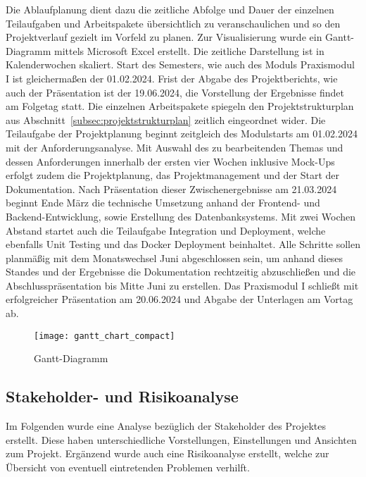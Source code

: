 Die Ablaufplanung dient dazu die zeitliche Abfolge und Dauer der einzelnen Teilaufgaben und Arbeitspakete übersichtlich zu veranschaulichen und so den Projektverlauf gezielt im Vorfeld zu planen.
Zur Visualisierung wurde ein Gantt-Diagramm mittels Microsoft Excel erstellt.
Die zeitliche Darstellung ist in Kalenderwochen skaliert.
Start des Semesters, wie auch des Moduls Praxismodul I ist gleichermaßen der 01.02.2024.
Frist der Abgabe des Projektberichts, wie auch der Präsentation ist der 19.06.2024, die Vorstellung der Ergebnisse findet am Folgetag statt.
\newpage
Die einzelnen Arbeitspakete spiegeln den Projektstrukturplan aus Abschnitt~\ref{subsec:projektstrukturplan} zeitlich eingeordnet wider.
Die Teilaufgabe der Projektplanung beginnt zeitgleich des Modulstarts am 01.02.2024 mit der Anforderungsanalyse.
Mit Auswahl des zu bearbeitenden Themas und dessen Anforderungen innerhalb der ersten vier Wochen inklusive Mock-Ups erfolgt zudem die Projektplanung, das Projektmanagement und der Start der Dokumentation.
Nach Präsentation dieser Zwischenergebnisse am 21.03.2024 beginnt Ende März die technische Umsetzung anhand der Frontend- und Backend-Entwicklung, sowie Erstellung des Datenbanksystems.
Mit zwei Wochen Abstand startet auch die Teilaufgabe Integration und Deployment, welche ebenfalls Unit Testing und das Docker Deployment beinhaltet.
Alle Schritte sollen planmäßig mit dem Monatswechsel Juni abgeschlossen sein, um anhand dieses Standes und der Ergebnisse die Dokumentation rechtzeitig abzuschließen und die Abschlusspräsentation bis Mitte Juni zu erstellen.
Das Praxismodul I schließt mit erfolgreicher Präsentation am 20.06.2024 und Abgabe der Unterlagen am Vortag ab.

\begin{figure}[H]
    \centering
    \texttt{[image: gantt\_chart\_compact]}
    \caption{Gantt-Diagramm}\label{fig:gantt-diagramm}
\end{figure}

\newpage

\subsection{Stakeholder- und Risikoanalyse}\label{subsec:Stakeholder-Risikoanalyse}
Im Folgenden wurde eine Analyse bezüglich der Stakeholder des Projektes erstellt.
Diese haben unterschiedliche Vorstellungen, Einstellungen und Ansichten zum Projekt.
Ergänzend wurde auch eine Risikoanalyse erstellt, welche zur Übersicht von eventuell eintretenden Problemen verhilft. \par

